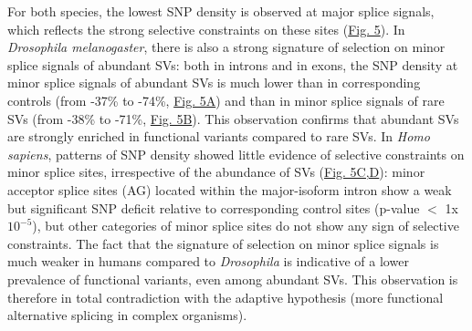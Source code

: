 For both species, the lowest SNP density is observed at major splice signals, which reflects the strong selective constraints on these sites (\hyperref[fig:AS5]{Fig. 5}). In \textit{Drosophila melanogaster}, there is also a strong signature of selection on minor splice signals of abundant \acrshort{SV}s: both in introns and in exons, the SNP density at minor splice signals of abundant \acrshort{SV}s is much lower than in corresponding controls (from -37\% to -74\%, \hyperref[fig:AS5]{Fig. 5A}) and than in minor splice signals of rare \acrshort{SV}s (from -38\% to -71\%, \hyperref[fig:AS5]{Fig. 5B}). This observation confirms that abundant \acrshort{SV}s are strongly enriched in functional variants compared to rare \acrshort{SV}s. In \textit{Homo sapiens}, patterns of SNP density showed little evidence of selective constraints on minor splice sites, irrespective of the abundance of \acrshort{SV}s (\hyperref[fig:AS5]{Fig. 5C,D}): minor acceptor splice sites (AG) located within the major-isoform intron show a weak but significant SNP deficit relative to corresponding control sites (p-value $<$ 1x$10^{-5}$), but other categories of minor splice sites do not show any sign of selective constraints. The fact that the signature of selection on minor splice signals is much weaker in humans compared to \textit{Drosophila} is indicative of a lower prevalence of functional variants, even among abundant \acrshort{SV}s. This observation is therefore in total contradiction with the adaptive hypothesis (more functional alternative splicing in complex organisms).


